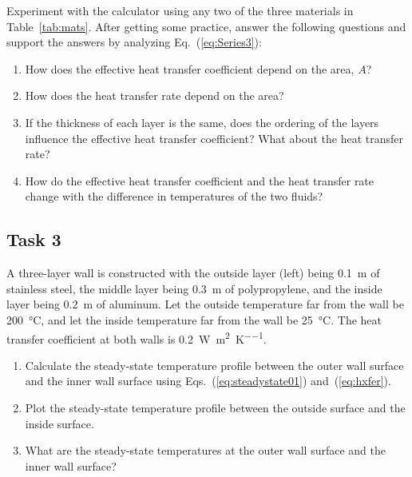 \documentclass{article}
\begin{document}
Experiment with the calculator using any two of the three materials in Table~\ref{tab:mats}.
After getting some practice, answer the following questions and support
the answers by analyzing Eq.~(\ref{eq:Series3}):
\begin{enumerate}
    \item How does the effective heat transfer coefficient depend on the area, $A$?
    \item How does the heat transfer rate depend on the area?
    \item If the thickness of each layer is the same, does the ordering of the
        layers influence the effective heat transfer coefficient?  What about the
        heat transfer rate?
    \item How do the effective heat transfer coefficient and the heat transfer
        rate change with the difference in temperatures of the two fluids?
\end{enumerate}

\subsection*{Task 3}
A three-layer wall is constructed with the outside layer (left) being \SI{0.1}{\meter} of
stainless steel, the middle layer being \SI{0.3}{\meter} of polypropylene, and the
inside layer being \SI{0.2}{\meter} of aluminum.  Let the outside temperature far from
the wall be \SI{200}{\degreeCelsius}, and let the inside temperature far from the wall
be \SI{25}{\degreeCelsius}. The heat transfer coefficient at both walls is
\SI{0.2}{\watt\per\meter\squared\per\kelvin}.
\begin{enumerate}
    \item Calculate the steady-state temperature profile between the outer wall surface and
the inner wall surface using Eqs.~(\ref{eq:steadystate01}) and~(\ref{eq:hxfer}).
    \item Plot the steady-state temperature profile between the outside surface and the inside
surface.
    \item What are the steady-state temperatures at the outer wall surface and the inner
        wall surface?
\end{enumerate}
\end{document}
